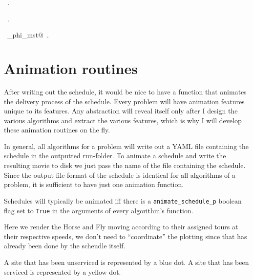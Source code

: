 \documentclass[11.5pt]{report}
\begin{document}
\begin{flushleft}
\begin{list}{}{}
\mbox{}\verb@@{\NWsep}
\end{list}
\vspace{-1.5ex}
\footnotesize
\begin{list}{}{\setlength{\itemsep}{-\parsep}\setlength{\itemindent}{-\leftmargin}}
\item \NWtxtMacroDefBy\ .
\item \NWtxtMacroRefIn\ .
\item \NWtxtIdentsDefed\nobreak\  \verb@draw_phi_mst@\nobreak\ .
\item{}
\end{list}
\vspace{4ex}
\end{flushleft}

\needspace{7cm}
\section{Animation routines}

\newchunk 
After writing out the schedule, it would be nice to have a function that animates the 
delivery process of the schedule. Every problem will have animation features unique to
its features. Any abstraction will reveal itself only after I design the various
algorithms and extract the various features, which is why I will develop these animation
routines on the fly. 

In general, all algorithms for a problem will write out a YAML file containing the schedule 
in the outputted run-folder. To animate a schedule and write the resulting movie to disk
we just pass the name of the file containing the schedule. Since the output file-format
of the schedule is identical for all algorithms of a problem, it is sufficient to have
just one animation function. 

Schedules will typically be animated iff there is a \verb|animate_schedule_p| boolean 
flag set to \verb|True| in the arguments of every algorithm's function. 

Here we render the Horse and Fly moving according to their 
assigned tours at their respective speeds, we don't 
need to ``coordinate'' the plotting since that has already 
been done by the scheudle itself. 
    
A site that has been unserviced is represented by a blue dot. 
A site that has been serviced is represented by a yellow dot. 
   
\end{document}
